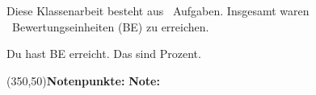 \begin{coverpages}
\begin{center}
\vspace*{0.7cm}
Diese Klassenarbeit besteht aus \numquestions\ Aufgaben. Insgesamt waren \numpoints\ Bewertungseinheiten (BE) zu erreichen. \smallskip

Du hast \underline{\hspace*{1.5cm}} BE erreicht. Das sind \underline{\hspace*{1.5cm}} Prozent. \medskip


\framebox(350,50){\textbf{Notenpunkte:} \underline{\hspace*{2cm}} \hspace*{1cm} \textbf{Note:} \underline{\hspace*{2cm}}}
\end{center}
\end{coverpages}
\restoregeometry